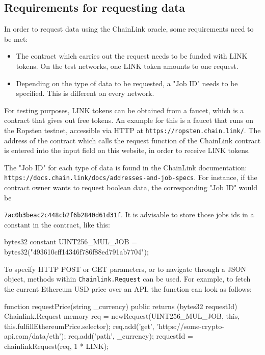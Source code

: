 \subsection*{Requirements for requesting data}
In order to request data using the ChainLink oracle, some requirements need to be met:
\begin{itemize}
	\item The contract which carries out the request needs to be funded with  LINK tokens. On the test networks, one LINK token amounts to one request.
	\item Depending on the type of data to be requested, a "Job ID" needs to be specified. This is different on every network.
\end{itemize}
For testing purposes, LINK tokens can be obtained from a faucet, which is a contract that gives out free tokens. An example for this is a faucet that runs on the Ropsten testnet, accessible via HTTP at \texttt{https://ropsten.chain.link/}. The address of the contract which calls the request function of the ChainLink contract is entered into the input field on this website, in order to receive LINK tokens.

The "Job ID" for each type of data is found in the ChainLink documentation: \texttt{https://docs.chain.link/docs/addresses-and-job-specs}. For instance, if the contract owner wants to request boolean data, the corresponding "Job ID" would be
 
\texttt{7ac0b3beac2c448cb2f6b2840d61d31f}. It is advisable to store those jobs ids in a constant in the contract, like this:

\begin{SolidityCode}
bytes32 constant UINT256_MUL_JOB = bytes32("493610cff14346f786f88ed791ab7704");
\end{SolidityCode}

To specify HTTP POST or GET parameters, or to navigate through a JSON object, methods within \texttt{Chainlink.Request} can be used. For example, to fetch the current Ethereum USD price over an API, the function can look as follows:
\begin{SolidityCode}
function requestPrice(string _currency) public returns (bytes32 requestId) {
	Chainlink.Request memory req =
	newRequest(UINT256_MUL_JOB, this, this.fulfillEthereumPrice.selector);
	req.add('get', 'https://some-crypto-api.com/data/eth');
	req.add('path', _currency);
	requestId = chainlinkRequest(req, 1 * LINK);
}
\end{SolidityCode}

